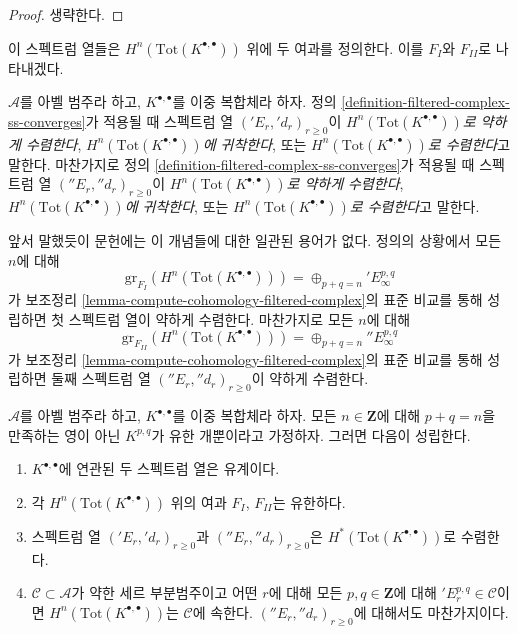 \begin{proof}
생략한다.
\end{proof}

\noindent
이 스펙트럼 열들은 $H^n(\text{Tot}(K^{\bullet, \bullet}))$ 위에 두
여과를 정의한다. 이를 $F_I$와 $F_{II}$로 나타내겠다.

\begin{definition}
\label{definition-ss-double-complex-converge}
$\mathcal{A}$를 아벨 범주라 하고, $K^{\bullet, \bullet}$를 이중
복합체라 하자. 정의 \ref{definition-filtered-complex-ss-converges}가
적용될 때 스펙트럼 열 $({}'E_r, {}'d_r)_{r \geq 0}$이
{\it $H^n(\text{Tot}(K^{\bullet, \bullet}))$로 약하게 수렴한다},
{\it $H^n(\text{Tot}(K^{\bullet, \bullet}))$에 귀착한다}, 또는
{\it $H^n(\text{Tot}(K^{\bullet, \bullet}))$로 수렴한다}고 말한다.
마찬가지로 정의 \ref{definition-filtered-complex-ss-converges}가 적용될
때 스펙트럼 열 $({}''E_r, {}''d_r)_{r \geq 0}$이
{\it $H^n(\text{Tot}(K^{\bullet, \bullet}))$로 약하게 수렴한다},
{\it $H^n(\text{Tot}(K^{\bullet, \bullet}))$에 귀착한다}, 또는
{\it $H^n(\text{Tot}(K^{\bullet, \bullet}))$로 수렴한다}고 말한다.
\end{definition}

\noindent
앞서 말했듯이 문헌에는 이 개념들에 대한 일관된 용어가 없다. 정의의
상황에서 모든 $n$에 대해
$$
\text{gr}_{F_I}(H^n(\text{Tot}(K^{\bullet, \bullet}))) =
\oplus_{p + q = n} {}'E_\infty^{p, q}
$$
가 보조정리 \ref{lemma-compute-cohomology-filtered-complex}의 표준
비교를 통해 성립하면 첫 스펙트럼 열이 약하게 수렴한다. 마찬가지로
모든 $n$에 대해
$$
\text{gr}_{F_{II}}(H^n(\text{Tot}(K^{\bullet, \bullet}))) =
\oplus_{p + q = n} {}''E_\infty^{p, q}
$$
가 보조정리 \ref{lemma-compute-cohomology-filtered-complex}의 표준
비교를 통해 성립하면 둘째 스펙트럼 열
$({}''E_r, {}''d_r)_{r \geq 0}$이 약하게 수렴한다.

\begin{lemma}
\label{lemma-first-quadrant-ss}
$\mathcal{A}$를 아벨 범주라 하고, $K^{\bullet, \bullet}$를 이중
복합체라 하자. 모든 $n \in \mathbf{Z}$에 대해 $p + q = n$을 만족하는
영이 아닌 $K^{p, q}$가 유한 개뿐이라고 가정하자. 그러면 다음이
성립한다.
\begin{enumerate}
\item $K^{\bullet, \bullet}$에 연관된 두 스펙트럼 열은 유계이다.
\item 각 $H^n(\text{Tot}(K^{\bullet, \bullet}))$ 위의 여과
$F_I$, $F_{II}$는 유한하다.
\item 스펙트럼 열 $({}'E_r, {}'d_r)_{r \geq 0}$과
$({}''E_r, {}''d_r)_{r \geq 0}$은
$H^*(\text{Tot}(K^{\bullet, \bullet}))$로 수렴한다.
\item $\mathcal{C} \subset \mathcal{A}$가 약한 세르 부분범주이고 어떤
$r$에 대해 모든 $p, q \in \mathbf{Z}$에 대해
${}'E_r^{p, q} \in \mathcal{C}$이면
$H^n(\text{Tot}(K^{\bullet, \bullet}))$는 $\mathcal{C}$에 속한다.
$({}''E_r, {}''d_r)_{r \geq 0}$에 대해서도 마찬가지이다.
\end{enumerate}
\end{lemma}

